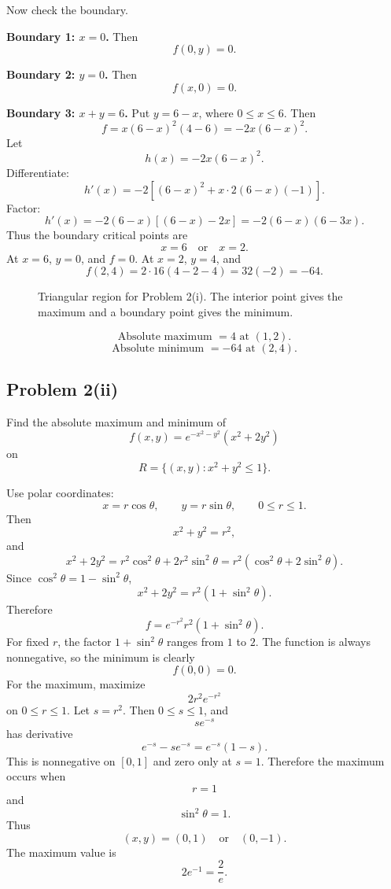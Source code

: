 \documentclass[11pt,a4paper]{article}
\begin{document}
Now check the boundary.

\textbf{Boundary 1: \(x=0\).}  Then
\[
 f(0,y)=0.
\]

\textbf{Boundary 2: \(y=0\).}  Then
\[
 f(x,0)=0.
\]

\textbf{Boundary 3: \(x+y=6\).}  Put \(y=6-x\), where \(0\le x\le6\).  Then
\[
 f=x(6-x)^2(4-6)=-2x(6-x)^2.
\]
Let
\[
 h(x)=-2x(6-x)^2.
\]
Differentiate:
\[
 h'(x)=-2\left[(6-x)^2+x\cdot2(6-x)(-1)\right].
\]
Factor:
\[
 h'(x)=-2(6-x)\left[(6-x)-2x\right]
 =-2(6-x)(6-3x).
\]
Thus the boundary critical points are
\[
 x=6 \quad\text{or}\quad x=2.
\]
At \(x=6\), \(y=0\), and \(f=0\).  At \(x=2\), \(y=4\), and
\[
 f(2,4)=2\cdot16(4-2-4)=32(-2)=-64.
\]

\begin{figure}[H]
\centering
{}
\caption{Triangular region for Problem 2(i).  The interior point gives the maximum and a boundary point gives the minimum.}
\end{figure}

\begin{answerbox}
\[
\boxed{\text{Absolute maximum }=4\text{ at }(1,2).}
\]
\[
\boxed{\text{Absolute minimum }=-64\text{ at }(2,4).}
\]
\end{answerbox}

\subsection{Problem 2(ii)}
Find the absolute maximum and minimum of
\[
 f(x,y)=e^{-x^2-y^2}(x^2+2y^2)
\]
on
\[
 R=\{(x,y):x^2+y^2\le1\}.
\]

Use polar coordinates:
\[
 x=r\cos\theta,
\qquad y=r\sin\theta,
\qquad 0\le r\le1.
\]
Then
\[
 x^2+y^2=r^2,
\]
and
\[
 x^2+2y^2=r^2\cos^2\theta+2r^2\sin^2\theta
=r^2(\cos^2\theta+2\sin^2\theta).
\]
Since \(\cos^2\theta=1-\sin^2\theta\),
\[
 x^2+2y^2=r^2(1+\sin^2\theta).
\]
Therefore
\[
 f=e^{-r^2}r^2(1+\sin^2\theta).
\]
For fixed \(r\), the factor \(1+\sin^2\theta\) ranges from \(1\) to \(2\).  The function is always nonnegative, so the minimum is clearly
\[
 f(0,0)=0.
\]
For the maximum, maximize
\[
 2r^2e^{-r^2}
\]
on \(0\le r\le1\).  Let \(s=r^2\).  Then \(0\le s\le1\), and
\[
 s e^{-s}
\]
has derivative
\[
 e^{-s}-se^{-s}=e^{-s}(1-s).
\]
This is nonnegative on \([0,1]\) and zero only at \(s=1\).  Therefore the maximum occurs when
\[
 r=1
\]
and
\[
 \sin^2\theta=1.
\]
Thus
\[
 (x,y)=(0,1)\quad\text{or}\quad(0,-1).
\]
The maximum value is
\[
 2e^{-1}=\frac2e.
\]
\end{document}
